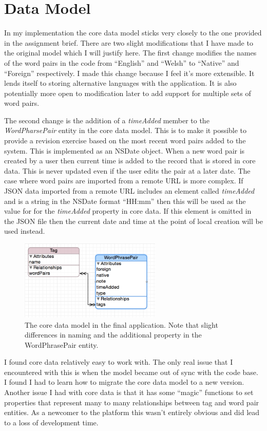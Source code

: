 \documentclass[paper=a4, fontsize=11pt]{scrartcl}	%
\numberwithin{equation}{section}															%
\numberwithin{figure}{section}																%
\numberwithin{table}{section}
\begin{document}
\section{Data Model}
In my implementation the core data model sticks very closely to the one provided in the assignment brief. There are two slight modifications that I have made to the original model which I will justify here. The first change modifies the names of the word pairs in the code from ``English'' and ``Welsh'' to ``Native'' and ``Foreign'' respectively. I made this change because I feel it's more extensible. It lends itself to storing alternative languages with the application. It is also potentially more open to modification later to add support for multiple sets of word pairs. 

The second change is the addition of a \textit{timeAdded} member to the \textit{WordPharsePair} entity in the core data model. This is to make it possible to provide a revision exercise based on the most recent word pairs added to the system. This is implemented as an NSDate object. When a new word pair is created by a user then current time is added to the record that is stored in core data. This is never updated even if the user edits the pair at a later date. The case where word pairs are imported from a remote URL is more complex. If JSON data imported from a remote URL includes an element called \textit{timeAdded} and is a string in the NSDate format ``HH:mm'' then this will be used as the value for for the \textit{timeAdded} property in core data. If this element is omitted in the JSON file then the current date and time at the point of local creation will be used instead. 

\begin{figure}[H]
\centering
\includegraphics[width=0.6\textwidth]{img/coredata.png}
\caption{The core data model in the final application. Note that slight differences in naming and the additional property in the WordPhrasePair entity.}
\label{fig:core-data}
\end{figure}

I found core data relatively easy to work with. The only real issue that I encountered with this is when the model became out of sync with the code base. I found I had to learn how to migrate the core data model to a new version. Another issue I had with core data is that it has some ``magic'' functions to set properties that represent many to many relationships between tag and word pair entities. As a newcomer to the platform this wasn't entirely obvious and did lead to a loss of development time.
\end{document}
